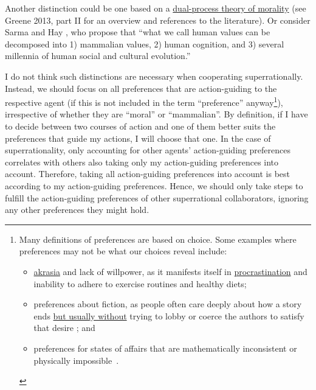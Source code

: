 Another distinction could be one based on a
\href{https://en.wikipedia.org/wiki/Dual_process_theory_(moral_psychology)}{dual-process
theory of morality} (see Greene 2013, part II for an overview and
references to the literature). Or consider Sarma and Hay \citeyear{noauthor_undated-wg}, who propose
that ``what we call human values can be decomposed into 1) mammalian values, 2) human cognition, and
3) several millennia of human social and cultural evolution.''

I do not think such distinctions are necessary when cooperating
superrationally. Instead, we should focus on all preferences that are
action-guiding to the respective agent (if this is not included in the
term ``preference'' anyway\footnote{Many definitions of preferences are
    based on choice.
  Some examples where preferences
  may not be what our choices reveal include:
  \begin{itemize}
  \item
  \href{https://en.wikipedia.org/wiki/Akrasia}{akrasia} and lack
  of willpower, as it manifests itself in
  \href{https://en.wikipedia.org/wiki/Procrastination}{procrastination}
  and inability to adhere to exercise routines and healthy diets;

  \item
  preferences about fiction, as people often care deeply about how a
  story ends
  \href{http://briantomasik.com/collection-quick-observations/\#Taking_fiction_seriously}{but
  usually without} trying to lobby or coerce the authors to satisfy
  that desire
  \parencite{Radford1975-my,noauthor_undated-sw}; and

  \item preferences for states of affairs that are mathematically inconsistent
  or physically impossible~\parencite{Oesterheld2017}. 
  \end{itemize}
  }), irrespective of whether they are ``moral'' or
``mammalian''. By definition, if I have to decide between two courses of
action and one of them better suits the preferences that guide my
actions, I will choose that one. In the case of superrationality, only
accounting for other agents' action-guiding preferences correlates with
others also taking only my action-guiding preferences into account.
Therefore, taking all action-guiding preferences into account is best
according to my action-guiding preferences. Hence, we should only take
steps to fulfill the action-guiding preferences of other superrational
collaborators, ignoring any other preferences they might hold.

